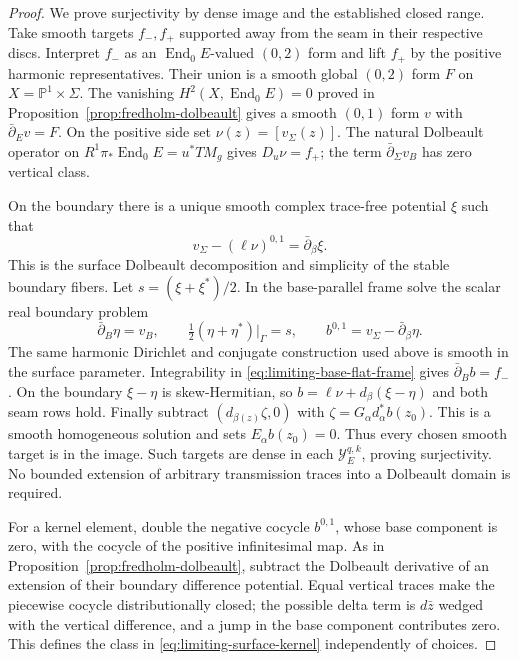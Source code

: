 \documentclass[11pt]{amsart}
\theoremstyle{definition}
\theoremstyle{remark}
\theoremstyle{plain}
\newcommand{\PP}{\mathbb{P}}
\newcommand{\End}{\operatorname{End}}
\begin{document}
\begin{proof}
We prove surjectivity by dense image and the established closed
range. Take smooth targets $f_-,f_+$ supported away from the seam
in their respective discs. Interpret $f_-$ as an $\End_0E$-valued
$(0,2)$ form and lift $f_+$ by the positive harmonic representatives.
Their union is a smooth global $(0,2)$ form $F$ on
$X=\PP^1\times\Sigma$. The vanishing
$H^2(X,\End_0E)=0$ proved in
Proposition~\ref{prop:fredholm-dolbeault} gives a smooth
$(0,1)$ form $v$ with $\bar\partial_Ev=F$. On the positive side
set $\nu(z)=[v_\Sigma(z)]$. The natural Dolbeault operator on
$R^1\pi_*\End_0E=u^*TM_g$ gives $D_u\nu=f_+$; the term
$\bar\partial_\Sigma v_B$ has zero vertical class.

On the boundary there is a unique smooth complex trace-free
potential $\xi$ such that
\[
 v_\Sigma-(\ell\nu)^{0,1}=\bar\partial_\beta\xi.
\]
This is the surface Dolbeault decomposition and simplicity of the
stable boundary fibers. Let $s=(\xi+\xi^*)/2$. In the base-parallel
frame solve the scalar real boundary problem
\begin{equation}\label{eq:limiting-real-boundary-correction}
 \bar\partial_B\eta=v_B,\qquad
 \tfrac12(\eta+\eta^*)|_\Gamma=s,
 \qquad b^{0,1}=v_\Sigma-\bar\partial_\beta\eta.
\end{equation}
The same harmonic Dirichlet and conjugate construction used above
is smooth in the surface parameter. Integrability in
\eqref{eq:limiting-base-flat-frame} gives
$\bar\partial_Bb=f_-$. On the boundary $\xi-\eta$ is
skew-Hermitian, so $b=\ell\nu+d_\beta(\xi-\eta)$ and both
seam rows hold. Finally subtract
$(d_{\beta(z)}\zeta,0)$ with
$\zeta=G_\alpha d_\alpha^*b(z_0)$. This is a smooth homogeneous
solution and sets $E_\alpha b(z_0)=0$. Thus every chosen smooth
target is in the image. Such targets are dense in each
$\mathcal Y_E^{q,k}$, proving surjectivity. No bounded extension
of arbitrary transmission traces into a Dolbeault domain is required.

For a kernel element, double the negative cocycle $b^{0,1}$,
whose base component is zero, with the cocycle of the positive
infinitesimal map. As in
Proposition~\ref{prop:fredholm-dolbeault}, subtract the
Dolbeault derivative of an extension of their boundary difference
potential. Equal vertical traces make the piecewise cocycle
distributionally closed; the possible delta term is
$d\bar z$ wedged with the vertical difference, and a jump in the
base component contributes zero. This defines the class in
\eqref{eq:limiting-surface-kernel} independently of choices.


\end{proof}
\end{document}
